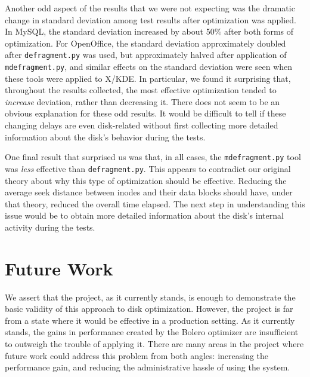 \documentclass[10pt,twocolumn,letterpaper]{article}
\begin{document}
Another odd aspect of the results that we were not expecting was the dramatic change in standard deviation among test results after optimization was applied. In MySQL, the standard deviation increased by about 50\% after both forms of optimization. For OpenOffice, the standard deviation approximately doubled after \texttt{defragment.py} was used, but approximately halved after application of \texttt{mdefragment.py}, and similar effects on the standard deviation were seen when these tools were applied to X/KDE. In particular, we found it surprising that, throughout the results collected, the most effective optimization tended to \emph{increase} deviation, rather than decreasing it. There does not seem to be an obvious explanation for these odd results. It would be difficult to tell if these changing delays are even disk-related without first collecting more detailed information about the disk's behavior during the tests.

One final result that surprised us was that, in all cases, the \texttt{mdefragment.py} tool was \emph{less} effective than \texttt{defragment.py}. This appears to contradict our original theory about why this type of optimization should be effective. Reducing the average seek distance between inodes and their data blocks should have, under that theory, reduced the overall time elapsed. The next step in understanding this issue would be to obtain more detailed information about the disk's internal activity during the tests.

\section{Future Work}\label{sec:future}

We assert that the project, as it currently stands, is enough to demonstrate the basic validity of this approach to disk optimization. However, the project is far from a state where it would be effective in a production setting. As it currently stands, the gains in performance created by the Bolero optimizer are insufficient to outweigh the trouble of applying it. There are many areas in the project where future work could address this problem from both angles: increasing the performance gain, and reducing the administrative hassle of using the system.
\end{document}
